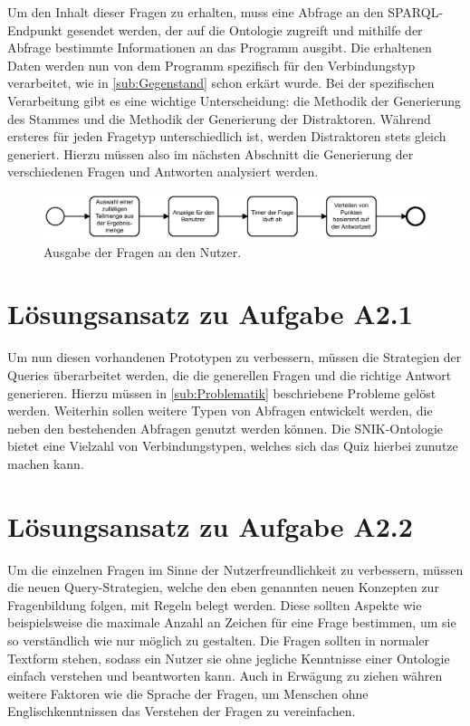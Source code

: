 \documentclass[headsepline,titlepage,ngerman,twoside,12pt]{report}
\begin{document}
Um den Inhalt dieser Fragen zu erhalten, muss eine Abfrage an den SPARQL-Endpunkt gesendet werden, der auf die Ontologie zugreift und mithilfe der Abfrage bestimmte Informationen an das Programm ausgibt.
Die erhaltenen Daten werden nun von dem Programm spezifisch für den Verbindungstyp verarbeitet, wie in \cref{sub:Gegenstand} schon erkärt wurde. Bei der spezifischen Verarbeitung gibt es eine wichtige Unterscheidung: die Methodik der Generierung des Stammes und die Methodik der Generierung der Distraktoren. Während ersteres für jeden Fragetyp unterschiedlich ist, werden Distraktoren stets gleich generiert. Hierzu müssen also im nächsten Abschnitt die Generierung der verschiedenen Fragen und Antworten analysiert werden.
\begin{figure}
\centering
\includegraphics[width=\textwidth]{images/ausg-frage.pdf}
\caption{Ausgabe der Fragen an den Nutzer.}
\label{img:question-output-to-user}
\end{figure}

\section{Lösungsansatz zu Aufgabe A2.1}
Um nun diesen vorhandenen Prototypen zu verbessern, müssen  die Strategien der Queries überarbeitet werden, die die generellen Fragen und die richtige Antwort generieren.
Hierzu müssen in \cref{sub:Problematik} beschriebene Probleme gelöst werden.
Weiterhin sollen weitere Typen von Abfragen entwickelt werden, die neben den bestehenden Abfragen genutzt werden können.
Die SNIK-Ontologie bietet eine Vielzahl von Verbindungstypen, welches sich das Quiz hierbei zunutze machen kann.

\section{Lösungsansatz zu Aufgabe A2.2}
Um die einzelnen Fragen im Sinne der Nutzerfreundlichkeit zu verbessern, müssen die neuen Query-Strategien, welche den eben genannten neuen Konzepten zur Fragenbildung folgen, mit Regeln belegt werden.
Diese sollten Aspekte wie beispielsweise die maximale Anzahl an Zeichen für eine Frage bestimmen, um sie so verständlich wie nur möglich zu gestalten.
Die Fragen sollten in normaler Textform stehen, sodass ein Nutzer sie ohne jegliche Kenntnisse einer Ontologie einfach verstehen und beantworten kann.
Auch in Erwägung zu ziehen währen weitere Faktoren wie die Sprache der Fragen, um Menschen ohne Englischkenntnissen das Verstehen der Fragen zu vereinfachen.
\end{document}
